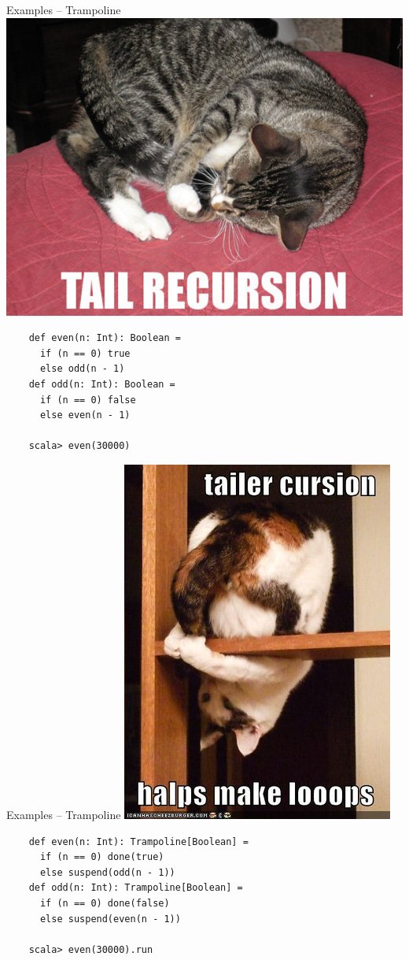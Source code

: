 \documentclass{beamer}
\begin{document}
\begin{frame}[fragile]{Examples -- Trampoline}
  \includegraphics[scale=0.2]{img/tailrec}
  \begin{verbatim}
    def even(n: Int): Boolean =
      if (n == 0) true
      else odd(n - 1)
    def odd(n: Int): Boolean =
      if (n == 0) false
      else even(n - 1)

    scala> even(30000)
  \end{verbatim}
\end{frame}

\begin{frame}[fragile]{Examples -- Trampoline}
  \includegraphics[scale=0.2]{img/tailrec2}
  \begin{verbatim}
    def even(n: Int): Trampoline[Boolean] =
      if (n == 0) done(true)
      else suspend(odd(n - 1))
    def odd(n: Int): Trampoline[Boolean] =
      if (n == 0) done(false)
      else suspend(even(n - 1))

    scala> even(30000).run
  \end{verbatim}
\end{frame}
\end{document}
